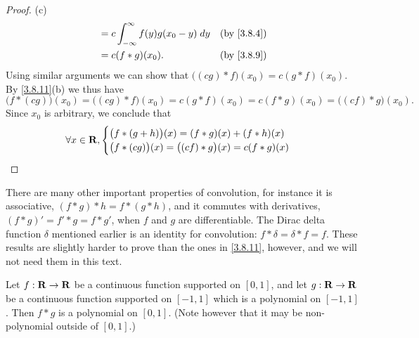 \begin{proof}{(c)}
\begin{align*}
     & = c \int_{-\infty}^\infty f(y) g(x_0 - y) \; dy     & \text{(by \cref{3.8.4})} \\
     & = c (f * g)(x_0).                                   & \text{(by \cref{3.8.9})}
  \end{align*}
  Using similar arguments we can show that \(\big((cg) * f\big)(x_0) = c (g * f)(x_0)\).
  By \cref{3.8.11}(b) we thus have
  \[
    \big(f * (cg)\big)(x_0) = \big((cg) * f\big)(x_0) = c(g * f)(x_0) = c(f * g)(x_0) = \big((cf) * g\big)(x_0).
  \]
  Since \(x_0\) is arbitrary, we conclude that
  \[
    \forall x \in \mathbf{R}, \begin{cases}
      \big(f * (g + h)\big)(x) = (f * g)(x) + (f * h)(x) \\
      \big(f * (cg)\big)(x) = \big((cf) * g\big)(x) = c(f * g)(x)
    \end{cases}
  \]
\end{proof}

\begin{remark}\label{3.8.12}
  There are many other important properties of convolution, for instance it is associative, \((f * g) * h = f * (g * h)\), and it commutes with derivatives, \((f * g)' = f' * g = f * g'\), when \(f\) and \(g\) are differentiable.
  The Dirac delta function \(\delta\) mentioned earlier is an identity for convolution:
  \(f * \delta = \delta * f = f\).
  These results are slightly harder to prove than the ones in \cref{3.8.11}, however, and we will not need them in this text.
\end{remark}

\begin{lemma}\label{3.8.13}
  Let \(f : \mathbf{R} \to \mathbf{R}\) be a continuous function supported on \([0, 1]\), and let \(g : \mathbf{R} \to \mathbf{R}\) be a continuous function supported on \([-1, 1]\) which is a polynomial on \([-1, 1]\).
  Then \(f * g\) is a polynomial on \([0, 1]\).
  (Note however that it may be non-polynomial outside of \([0, 1].\))
\end{lemma}

